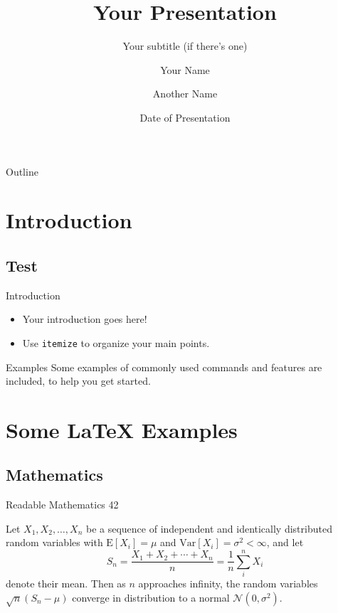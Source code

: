\documentclass[
  10pt,
  aspectratio=169,
  xcolor={dvipsnames,table,x11names},  %
]{beamer}
\title[Your Short Title]{Your Presentation}
\subtitle{Your subtitle (if there's one)}
\author[\MakeUppercase{Your name (short)}]{Your Name \and Another Name}  %
\institute{Your Faculty/Department}
\date{Date of Presentation}
\begin{document}
{  %
\begin{frame}  %
  \vspace*{-4\baselineskip}%
  \titlepage
\end{frame}
}


\begin{frame}{Outline}
  \hypersetup{linkcolor=black}
  \tableofcontents[sectionstyle=shaded/show, hideallsubsections]
\end{frame}

\section{Introduction}
  \subsection{Test}

\begin{frame}{Introduction}

\begin{itemize}
  \item Your introduction goes here!
  \item Use \texttt{itemize} to organize your main points.
\end{itemize}

\begin{block}{Examples}
Some examples of commonly used commands and features are included, to help you get started.
\end{block}

\end{frame}

\section{Some \LaTeX{} Examples}

\subsection{Mathematics}

\begin{frame}{Readable Mathematics 42}

Let $X_1, X_2, \ldots, X_n$ be a sequence of independent and identically distributed random variables with $\text{E}[X_i] = \mu$ and $\text{Var}[X_i] = \sigma^2 < \infty$, and let
$$S_n = \frac{X_1 + X_2 + \cdots + X_n}{n}
      = \frac{1}{n}\sum_{i}^{n} X_i$$
denote their mean. Then as $n$ approaches infinity, the random variables $\sqrt{n}(S_n - \mu)$ converge in distribution to a normal $\mathcal{N}(0, \sigma^2)$.

\end{frame}
\end{document}
